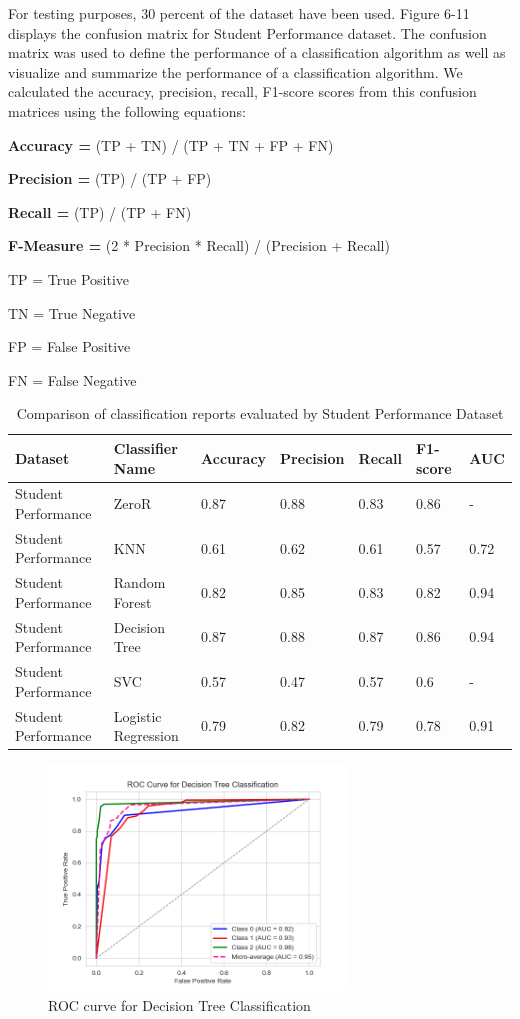 \documentclass[conference]{IEEEtran}
\begin{document}
For testing purposes, 30 percent of the dataset have been used. Figure 6-11 displays the confusion matrix for Student Performance dataset. The confusion matrix was used to define the performance of a classification algorithm as well as visualize and summarize the performance of a classification algorithm. We calculated the accuracy, precision, recall, F1-score scores from this confusion matrices using the following equations:\par
\vspace{3mm}
\textbf{Accuracy =} (TP + TN) / (TP + TN + FP + FN)

\textbf{Precision =} (TP) / (TP + FP)

\textbf{Recall =} (TP) / (TP + FN)

\textbf{F-Measure =} (2 * Precision * Recall) / (Precision + Recall)



TP = True Positive

TN = True Negative

FP = False Positive

FN = False Negative

\FloatBarrier
\begin{table}[hbt!]
\label{table3}
\centering
\caption{Comparison of classification reports evaluated by Student Performance Dataset}
\begin{tabular} {|p{1cm}|p{1cm}|p{1cm}|p{1cm}|p{1cm}|p{1cm}|p{1cm}|}
\hline
Dataset& Classifier Name & Accuracy& Precision&Recall&F1-score &AUC\\\hline
Student Performance & ZeroR & 0.87  &  0.88 &  0.83 & 0.86 & -\\ \hline 
Student Performance& KNN & 0.61  & 0.62 & 0.61 & 0.57
& 0.72\\ \hline
Student Performance & Random Forest & 0.82  & 0.85 &0.83&0.82 &0.94 \\ \hline
Student Performance& Decision Tree & 0.87  & 0.88&0.87& 0.86 &0.94\\ \hline
Student Performance& SVC & 0.57  & 0.47 &0.57&0.6 &-\\ \hline
Student Performance & Logistic Regression & 0.79  & 0.82 &0.79&0.78 &0.91 \\ \hline
\end{tabular}
\end{table}

\begin{figure}[H]
    \centering
    \includegraphics[width=8cm]{fig12.png}
    \caption{ROC curve for Decision Tree Classification}
    \label{fig:12}
\end{figure}
\end{document}

